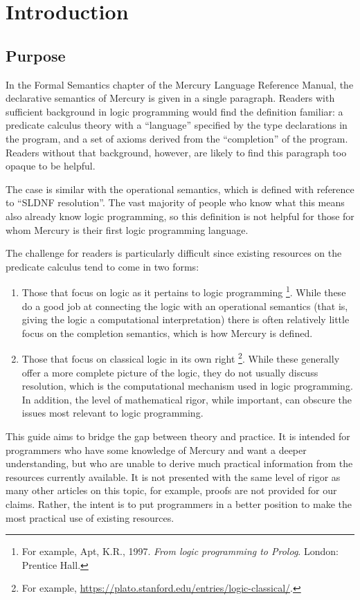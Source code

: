 \chapter{Introduction}
\label{sec:intro}

\section{Purpose}
\label{sec:purpose}

In the Formal Semantics chapter of the Mercury Language Reference Manual,
the declarative semantics of Mercury is given in a single paragraph.
Readers with sufficient background in logic programming
would find the definition familiar:
a predicate calculus theory
with a ``language'' specified by the type declarations in the program,
and a set of axioms derived from the ``completion'' of the program.
Readers without that background, however,
are likely to find this paragraph too opaque to be helpful.

The case is similar with the operational semantics,
which is defined with reference to ``SLDNF resolution''.
The vast majority of people who know what this means
also already know logic programming,
so this definition is not helpful
for those for whom Mercury is their first logic programming language.

The challenge for readers is particularly difficult
since existing resources on the predicate calculus
tend to come in two forms:
\begin{enumerate}
\item
Those that focus on logic as it pertains to logic programming%
\footnote{
For example,
Apt, K.R., 1997. \textit{From logic programming to Prolog}.
London: Prentice Hall.
}.
While these do a good job at connecting the logic
with an operational semantics
(that is, giving the logic a computational interpretation)
there is often relatively little focus on the completion semantics,
which is how Mercury is defined.
\item
Those that focus on classical logic in its own right%
\footnote{
For example,
\href{https://plato.stanford.edu/entries/logic-classical/}
{https://plato.stanford.edu/entries/logic-classical/}.
}.
While these generally offer a more complete picture of the logic,
they do not usually discuss resolution,
which is the computational mechanism used in logic programming.
In addition, the level of mathematical rigor, while important,
can obscure the issues most relevant to logic programming.
\end{enumerate}
This guide aims to bridge the gap between theory and practice.
It is intended for programmers who have some knowledge of Mercury
and want a deeper understanding,
but who are unable to derive much practical information
from the resources currently available.
It is not presented with the same level of rigor
as many other articles on this topic,
for example, proofs are not provided for our claims.
Rather, the intent is to put programmers in a better position
to make the most practical use of existing resources.

